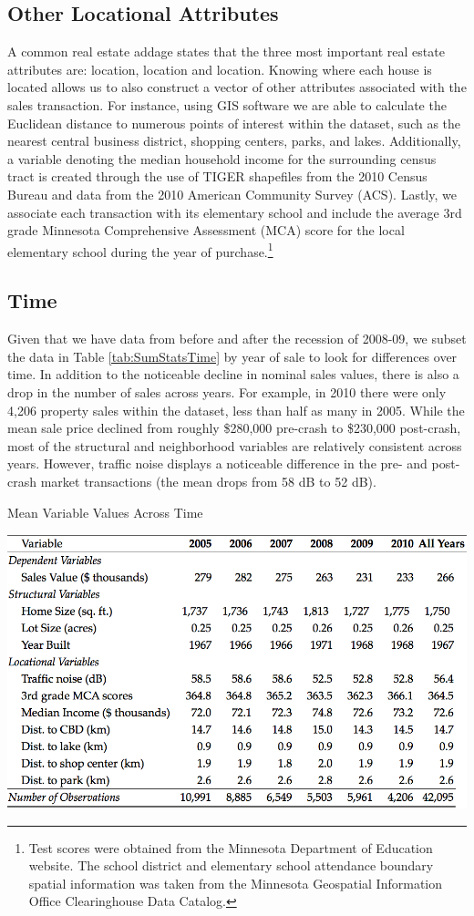 \documentclass{article}\usepackage{graphicx, color}
\begin{document}
\subsection{Other Locational Attributes}
A common real estate addage states that the three most important real estate attributes are: location, location and location. Knowing where each house is located allows us to also construct a vector of other attributes associated with the sales transaction. For instance, using GIS software we are able to calculate the Euclidean distance to numerous points of interest within the dataset, such as the nearest central business district, shopping centers, parks, and lakes. Additionally, a variable denoting the median household income for the surrounding census tract is created through the use of TIGER shapefiles from the 2010 Census Bureau and data from the 2010 American Community Survey (ACS). Lastly, we associate each transaction with its elementary school and include the average 3rd grade Minnesota Comprehensive Assessment (MCA) score for the local elementary school during the year of purchase.\footnote{Test scores were obtained from the Minnesota Department of Education website. The school district and elementary school attendance boundary spatial information was taken from the Minnesota Geospatial Information Office Clearinghouse Data Catalog.} 

\subsection{Time}
Given that we have data from before and after the recession of 2008-09, we subset the data in Table \ref{tab:SumStatsTime} by year of sale to look for differences over time. In addition to the noticeable decline in nominal sales values, there is also a drop in the number of sales across years. For example, in 2010 there were only 4,206 property sales within the dataset, less than half as many in 2005. While the mean sale price declined from roughly \$280,000 pre-crash to \$230,000 post-crash, most of the structural and neighborhood variables are relatively consistent across years. However, traffic noise displays a noticeable difference in the pre- and post-crash market transactions (the mean drops from 58 dB to 52 dB). 

\begin{table}
\caption{Mean Variable Values Across Time}\label{tab:SumStatsTime}
\includegraphics[width = \textwidth]{../graphs/DescriptiveStatsByYear}
\end{table}
\end{document}
